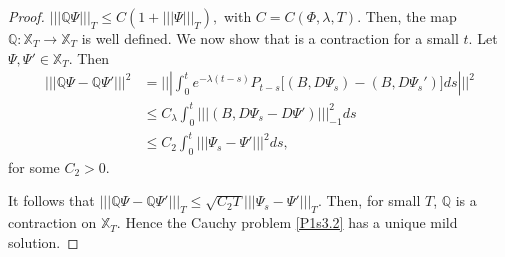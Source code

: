 \documentclass[]{interact}
\theoremstyle{plain}%
\theoremstyle{definition}
\theoremstyle{remark}
\begin{document}
\begin{proof}
        $
         ||| \mathbb{Q} \Psi|||_T \le C(1 + ||| \Psi|||_T),
        $
        with $C = C(\Phi, \lambda, T)$. Then, the map $\mathbb{Q}:\mathbb{X}_T
        \rightarrow \mathbb{X}_T$ is well defined. We now show that is a 
        contraction
        for a small $t$. Let $\Psi,\Psi'\in \mathbb{X}_T$. Then
        \begin{align*}
            ||| \mathbb{Q}\Psi- \mathbb{Q}\Psi'|||^2 
                &=  
                |||
                    \int_0^t e^{-\lambda (t-s)}
                        P_{t-s}
                        \big[
                            (B,D\Psi_s)-(B,D\Psi_s')
                        \big] ds 
                |||^2
                \\
                &\le  C_\lambda 
                \int_0^t 
                |||
                    (B,D\Psi_s-D\Psi') 
                |||_{-1}^2 ds \\
                &\le  C_2 
                \int_0^t 
                |||
                    \Psi_s-\Psi'
                |||^2 ds,
        \end{align*}
        for some $C_2>0$. 
    
            It follows that
        $
            ||| 
                \mathbb{Q}\Psi - \mathbb{Q}\Psi'
            |||_T  
            \le  
            \sqrt{C_2 T}
            |||
                \Psi_s - \Psi'
            |||_T.
        $
        Then, for small $T$, $\mathbb{Q}$ is a contraction on $\mathbb{X}_T$. 
        Hence the Cauchy problem \eqref{P1s3.2} has a unique mild solution.
    \end{proof}
\end{document}
